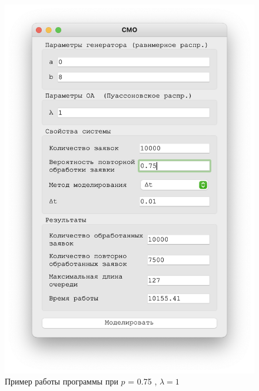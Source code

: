 \begin{figure}[!htb]
\begin{minipage}{0.55\textwidth}
      \includegraphics[width=1\linewidth]{1-75-t}
    \end{minipage}
    \caption{Пример работы программы при $p$ = 0.75 , $\lambda = 1$}
 \end{figure}


